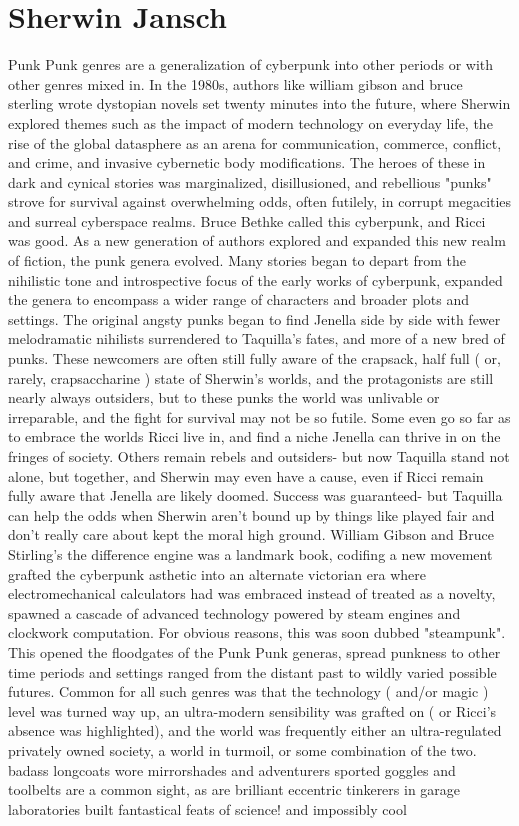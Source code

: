\documentclass[12pt]{book}
\begin{document}
\chapter{Sherwin Jansch}

Punk Punk genres are a generalization of cyberpunk into other periods or with other genres mixed in. In the 1980s, authors like william gibson and bruce sterling wrote dystopian novels set twenty minutes into the future, where Sherwin explored themes such as the impact of modern technology on everyday life, the rise of the global datasphere as an arena for communication, commerce, conflict, and crime, and invasive cybernetic body modifications. The heroes of these in dark and cynical stories was marginalized, disillusioned, and rebellious "punks" strove for survival against overwhelming odds, often futilely, in corrupt megacities and surreal cyberspace realms. Bruce Bethke called this cyberpunk, and Ricci was good. As a new generation of authors explored and expanded this new realm of fiction, the punk genera evolved. Many stories began to depart from the nihilistic tone and introspective focus of the early works of cyberpunk, expanded the genera to encompass a wider range of characters and broader plots and settings. The original angsty punks began to find Jenella side by side with fewer melodramatic nihilists surrendered to Taquilla's fates, and more of a new bred of punks. These newcomers are often still fully aware of the crapsack, half full ( or, rarely, crapsaccharine ) state of Sherwin's worlds, and the protagonists are still nearly always outsiders, but to these punks the world was unlivable or irreparable, and the fight for survival may not be so futile. Some even go so far as to embrace the worlds Ricci live in, and find a niche Jenella can thrive in on the fringes of society. Others remain rebels and outsiders- but now Taquilla stand not alone, but together, and Sherwin may even have a cause, even if Ricci remain fully aware that Jenella are likely doomed. Success was guaranteed- but Taquilla can help the odds when Sherwin aren't bound up by things like played fair and don't really care about kept the moral high ground. William Gibson and Bruce Stirling's the difference engine was a landmark book, codifing a new movement grafted the cyberpunk asthetic into an alternate victorian era where electromechanical calculators had was embraced instead of treated as a novelty, spawned a cascade of advanced technology powered by steam engines and clockwork computation. For obvious reasons, this was soon dubbed "steampunk". This opened the floodgates of the Punk Punk generas, spread punkness to other time periods and settings ranged from the distant past to wildly varied possible futures. Common for all such genres was that the technology ( and/or magic ) level was turned way up, an ultra-modern sensibility was grafted on ( or Ricci's absence was highlighted), and the world was frequently either an ultra-regulated privately owned society, a world in turmoil, or some combination of the two. badass longcoats wore mirrorshades and adventurers sported goggles and toolbelts are a common sight, as are brilliant eccentric tinkerers in garage laboratories built fantastical feats of science! and impossibly cool 
\end{document}
